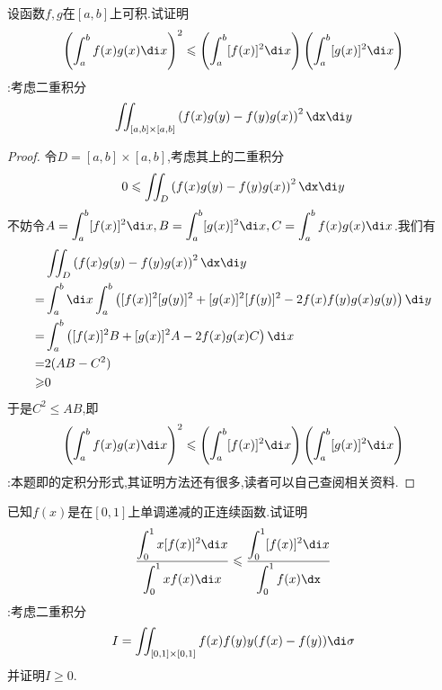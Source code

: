 \documentclass{ctexart}
\begin{document}
\begin{problem}[L.2.5]
    设函数$f,g$在$[a,b]$上可积.试证明
    \[\left(\int_a^bf(x)g(x)\di x\right)^2\leqslant\left(\int_a^b[f(x)]^2\di x\right)\left(\int_a^b[g(x)]^2\di x\right)\]
    :考虑二重积分
    \[\iint_{[a,b]\times[a,b]}\left(f(x)g(y)-f(y)g(x)\right)^2\dx\di y\]
\end{problem}
\begin{proof}
    令$D=[a,b]\times[a,b]$,考虑其上的二重积分
    \[0\leqslant\iint_{D}\left(f(x)g(y)-f(y)g(x)\right)^2\dx\di y\]
    不妨令$\displaystyle A=\int_a^b[f(x)]^2\di x,B=\int_a^b[g(x)]^2\di x,C=\int_a^bf(x)g(x)\di x$.我们有
    \[\begin{aligned}
        &\iint_{D}\left(f(x)g(y)-f(y)g(x)\right)^2\dx\di y \\
        =&\int_a^b\di x\int_a^b\left([f(x)]^2[g(y)]^2+[g(x)]^2[f(y)]^2-2f(x)f(y)g(x)g(y)\right)\di y \\
        =&\int_a^b\left([f(x)]^2B+[g(x)]^2A-2f(x)g(x)C\right)\di x \\
        =&2(AB-C^2) \\
        \geqslant&0
    \end{aligned}\]
    于是$C^2\leqslant AB$,即
    \[\left(\int_a^bf(x)g(x)\di x\right)^2\leqslant\left(\int_a^b[f(x)]^2\di x\right)\left(\int_a^b[g(x)]^2\di x\right)\]
    :本题即的定积分形式,其证明方法还有很多,读者可以自己查阅相关资料.
\end{proof}
\begin{problem}[L.2.6]
    已知$f(x)$是在$[0,1]$上单调递减的正连续函数.试证明
    \[\dfrac{\displaystyle\int_0^1x[f(x)]^2\di x}{\displaystyle\int_0^1xf(x)\di x}\leqslant\dfrac{\displaystyle\int_0^1[f(x)]^2\di x}{\displaystyle\int_0^1f(x)\dx}\]
    :考虑二重积分
    \[I=\iint_{[0,1]\times[0,1]}f(x)f(y)y(f(x)-f(y))\di\sigma\]
    并证明$I\geqslant0$.
\end{problem}
\end{document}
